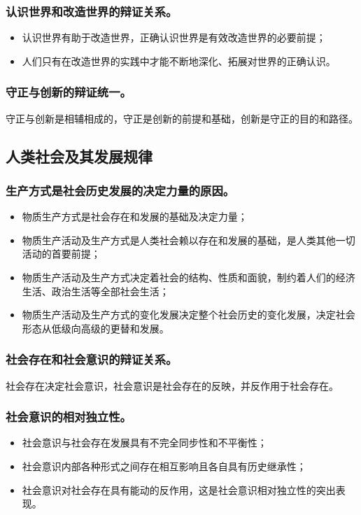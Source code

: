 \documentclass{article}
\begin{document}
\subsubsection{认识世界和改造世界的辩证关系。}
\begin{itemize}
    \item 认识世界有助于改造世界，正确认识世界是有效改造世界的必要前提；
    \item 人们只有在改造世界的实践中才能不断地深化、拓展对世界的正确认识。
\end{itemize}

\subsubsection{守正与创新的辩证统一。}
守正与创新是相辅相成的，守正是创新的前提和基础，创新是守正的目的和路径。

\subsection{人类社会及其发展规律}

\subsubsection{生产方式是社会历史发展的决定力量的原因。}
\begin{itemize}
    \item 物质生产方式是社会存在和发展的基础及决定力量；
    \item 物质生产活动及生产方式是人类社会赖以存在和发展的基础，是人类其他一切活动的首要前提；
    \item 物质生产活动及生产方式决定着社会的结构、性质和面貌，制约着人们的经济生活、政治生活等全部社会生活；
    \item 物质生产活动及生产方式的变化发展决定整个社会历史的变化发展，决定社会形态从低级向高级的更替和发展。
\end{itemize}

\subsubsection{社会存在和社会意识的辩证关系。}
社会存在决定社会意识，社会意识是社会存在的反映，并反作用于社会存在。

\subsubsection{社会意识的相对独立性。}
\begin{itemize}
    \item 社会意识与社会存在发展具有不完全同步性和不平衡性；
    \item 社会意识内部各种形式之间存在相互影响且各自具有历史继承性；
    \item 社会意识对社会存在具有能动的反作用，这是社会意识相对独立性的突出表现。
\end{itemize}
\end{document}

